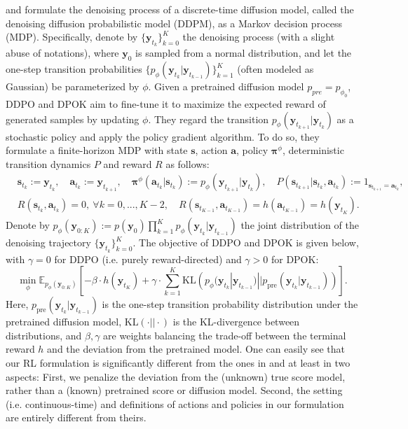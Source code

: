 \documentclass[11pt]{article}
\newcommand{\bpi}{\boldsymbol{\pi}}
\begin{document}
\cite{black2023training} and \cite{fan2024reinforcement} formulate the denoising process of a discrete-time diffusion model, called the denoising diffusion probabilistic model (DDPM), as a Markov decision process (MDP). Specifically, denote by $\{\mathbf{y}_{t_k}\}_{k=0}^{K}$ the denoising process (with a slight abuse of notations), where $\mathbf{y}_0$ is sampled from a normal distribution, and let the one-step transition probabilities $\{p_{\phi}(\mathbf{y}_{t_{k}}| \mathbf{y}_{t_{k - 1}})\}_{k=1}^K$ (often modeled as Gaussian) be parameterized by $\phi$. Given a pretrained diffusion model $p_{pre}=p_{\phi_0}$,
DDPO and DPOK aim to fine-tune it to maximize the expected reward of generated samples by updating $\phi$. They regard the transition $p_\phi(\mathbf{y}_{t _{k + 1}} | \mathbf{y}_{t_k})$ as a stochastic policy and apply the policy gradient algorithm. To do so, they formulate a finite-horizon MDP with state $\mathbf{s}$, action $\mathbf{a}$, policy $\bpi^\phi$, deterministic transition dynamics $P$ and reward $R$ as follows:
	\begin{align*}
		&\mathbf{s}_{t_k} := \mathbf{y}_{t_k},\quad \mathbf{a}_{t_k} := \mathbf{y}_{t_{k + 1}}, \quad \bpi^\phi(\mathbf{a}_{t_k} | \mathbf{s}_{t_k}) := p_\phi(\mathbf{y}_{t _{k + 1}} | \mathbf{y}_{t_k}),\quad P(\mathbf{s}_{t_{k + 1}} | \mathbf{s}_{t_k}, \mathbf{a}_{t_k}) := 1_{\mathbf{s}_{t_{k + 1}} = \mathbf{a}_{t_{k}}},\\
		& R(\mathbf{s}_{t_k}, \mathbf{a}_{t_k}) = 0,\ \forall k=0, ..., K - 2,\quad R(\mathbf{s}_{t_{K - 1}}, \mathbf{a}_{t_{K - 1}}) = h(\mathbf{a}_{t_{K - 1}}) = h(\mathbf{y}_{t_K}).
	\end{align*}
Denote by $p_\phi(\mathbf{y}_{0:K}):= p(\mathbf{y}_0)\prod_{k=1}^{K}p_{\phi}(\mathbf{y}_{t_{k}} | \mathbf{y}_{t_{k - 1}})$ the joint distribution of the denoising trajectory $\{\mathbf{y}_{t_k}\}_{k=0}^{K}$.
 The objective of DDPO and DPOK is given below, with $\gamma = 0$ for DDPO (i.e. purely reward-directed) and $\gamma > 0$ for DPOK:
\begin{equation}\label{eq:objective_DPOK}
	\min_{\phi}\mathbb{E}_{p_\phi(\mathbf{y}_{0:K})}\left[-\beta\cdot h(\mathbf{y}_{t_K})+ \gamma\cdot \sum_{k=1}^{K}\text{KL}\left(p_{\phi}(\mathbf{y}_{t_{k}} | \mathbf{y}_{t_{k - 1}}) || p_{\text{pre}}(\mathbf{y}_{t_{k}} | \mathbf{y}_{t_{k - 1}})\right)\right].
\end{equation}
Here, $p_{\text{pre}}(\mathbf{y}_{t_{k}} | \mathbf{y}_{t_{k - 1}})$ is the one-step transition probability distribution under the pretrained diffusion model, KL$(\cdot || \cdot)$ is the KL-divergence between distributions, and $\beta, \gamma$ are weights balancing the trade-off between the terminal reward $h$ and the deviation from the pretrained model.  One can easily see that our RL formulation  is significantly different from the ones in \cite{black2023training} and \cite{fan2024reinforcement} at least in two aspects: First, we penalize the deviation from the (unknown) true score model, rather than a (known) pretrained score or diffusion model.
Second, the setting (i.e. continuous-time) and definitions of actions and policies in our formulation are entirely different from theirs.
\end{document}
